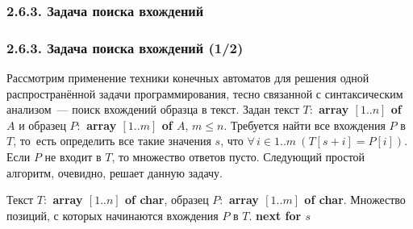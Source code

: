 \documentclass[mathserif,12pt,aspectratio=169]{beamer}
\def\A#1#2{\forall\,#1\ \left(#2\right)}
\let\leq\leqslant
\begin{document}
\subsubsection{2.6.3. Задача поиска вхождений}
\label{2.6.3.}
\begin{frame}
\frametitle{2.6.3. Задача поиска вхождений (1/2)}


Рассмотрим применение техники конечных
автоматов для решения одной распространённой задачи программирования, тесно связанной с синтаксическим анализом~---
поиск вхождений образца в текст.
Задан текст
\textbf{$T:$ array $[1..n]$ of $A$}
и образец
\textbf{$P:$ array $[1..m]$ of $A$},
$m\leq n$. Требуется найти
все вхождения $P$ в $T$, то~есть определить все такие
значения $s$, что $\A{i \in 1..m}{T[s+i]= P[i]}$. Если $P$ не
входит в $T$, то множество ответов пусто.
Следующий простой алгоритм, очевидно, решает
данную задачу.

\begin{algorithmic}
\REQUIRE Текст \textbf{$T:$ array $[1..n]$ of char}, образец
\textbf{$P:$ array $[1..m]$ of char}.
\ENSURE Множество
позиций, с которых начинаются вхождения $P$ в $T$. 
      \STATE \textbf{next for $s$}
    \ENDIF
 \ENDFOR
  
\ENDFOR
\end{algorithmic}

\end{frame}
\end{document}
